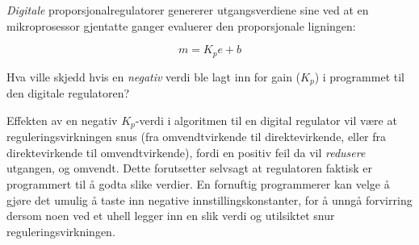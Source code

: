 

{\it Digitale} proporsjonalregulatorer genererer utgangsverdiene sine ved at en mikroprosessor gjentatte ganger evaluerer den proporsjonale ligningen:

$$m = K_p e + b$$
 
Hva ville skjedd hvis en {\it negativ} verdi ble lagt inn for gain ($K_p$) i programmet til den digitale regulatoren?







Effekten av en negativ $K_p$-verdi i algoritmen til en digital regulator vil være at reguleringsvirkningen snus (fra omvendtvirkende til direktevirkende, eller fra direktevirkende til omvendtvirkende), fordi en positiv feil da vil {\it redusere} utgangen, og omvendt. Dette forutsetter selvsagt at regulatoren faktisk er programmert til å godta slike verdier. En fornuftig programmerer kan velge å gjøre det umulig å taste inn negative innstillingskonstanter, for å unngå forvirring dersom noen ved et uhell legger inn en slik verdi og utilsiktet snur reguleringsvirkningen.










